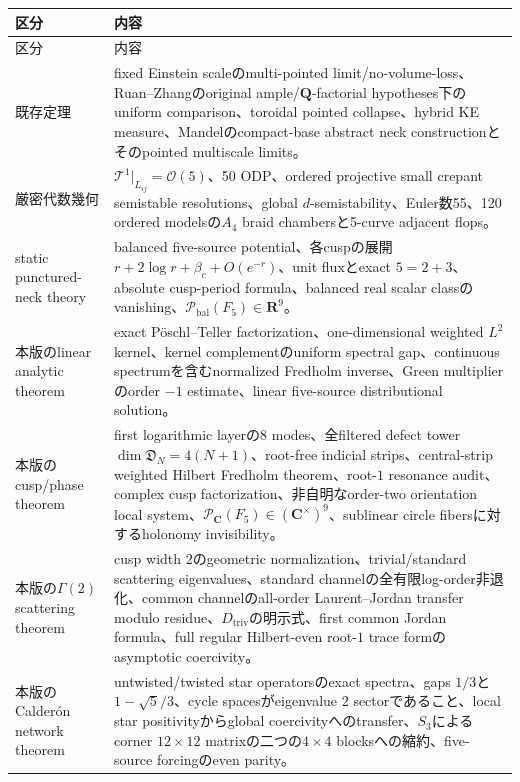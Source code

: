 \documentclass[11pt,a4paper]{ltjsarticle}
\theoremstyle{definition}
\theoremstyle{remark}
\newcommand{\CC}{\mathbf C}
\newcommand{\RR}{\mathbf R}
\begin{document}
\begin{longtable}{p{}p{}}
\toprule
区分 & 内容\\
\midrule
\endfirsthead
\toprule
区分 & 内容\\
\midrule
\endhead
既存定理 & fixed Einstein scaleのmulti-pointed limit/no-volume-loss、Ruan--Zhangのoriginal ample/$\mathbf Q$-factorial hypotheses下のuniform comparison、toroidal pointed collapse、hybrid KE measure、Mandelのcompact-base abstract neck constructionとそのpointed multiscale limits。\\[1mm]
厳密代数幾何 & $\mathcal T^1|_{L_{ij}}=\mathcal O(5)$、50 ODP、ordered projective small crepant semistable resolutions、global $d$-semistability、Euler数55、120 ordered modelsの$A_4$ braid chambersと5-curve adjacent flops。\\[1mm]
static punctured-neck theory & balanced five-source potential、各cuspの展開$r+2\log r+\beta_c+O(e^{-r})$、unit fluxとexact $5=2+3$、absolute cusp-period formula、balanced real scalar classのvanishing、$\mathcal P_{\mathrm{bal}}(F_5)\in\RR^9$。\\[1mm]
本版のlinear analytic theorem & exact Pöschl--Teller factorization、one-dimensional weighted $L^2$ kernel、kernel complementのuniform spectral gap、continuous spectrumを含むnormalized Fredholm inverse、Green multiplierのorder $-1$ estimate、linear five-source distributional solution。\\[1mm]
本版のcusp/phase theorem & first logarithmic layerの8 modes、全filtered defect tower $\dim\mathfrak D_N=4(N+1)$、root-free indicial strips、central-strip weighted Hilbert Fredholm theorem、root-$1$ resonance audit、complex cusp factorization、非自明なorder-two orientation local system、$\mathcal P_{\CC}(F_5)\in(\CC^\times)^9$、sublinear circle fibersに対するholonomy invisibility。\\[1mm]
本版の$\Gamma(2)$ scattering theorem & cusp width $2$のgeometric normalization、trivial/standard scattering eigenvalues、standard channelの全有限log-order非退化、common channelのall-order Laurent--Jordan transfer modulo residue、$D_{\mathrm{triv}}$の明示式、first common Jordan formula、full regular Hilbert-even root-$1$ trace formのasymptotic coercivity。\\[1mm]
本版のCalder\'on network theorem & untwisted/twisted star operatorsのexact spectra、gaps $1/3$と$1-\sqrt5/3$、cycle spacesがeigenvalue $2$ sectorであること、local star positivityからglobal coercivityへのtransfer、$S_3$によるcorner $12\times12$ matrixの二つの$4\times4$ blocksへの縮約、five-source forcingのeven parity。\\[1mm]

\end{longtable}
\end{document}
